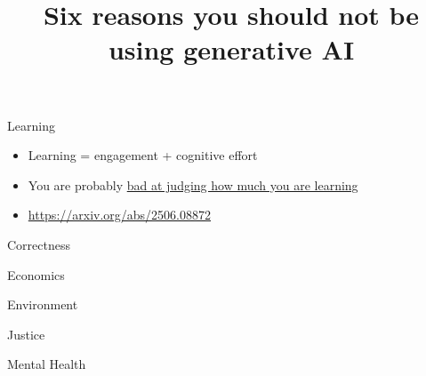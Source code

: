 \documentclass[xcolor={usenames,dvipsnames,svgnames,table},12pt]{beamer}
\title{Six reasons you should not be using generative AI}
\date{}
\begin{document}
\maketitle

\begin{frame}{Learning}
  \begin{itemize}
  \item Learning = engagement + cognitive effort
  \item You are probably \href{https://www.pnas.org/doi/10.1073/pnas.1821936116}{bad at judging how much you are learning}
  \item \url{https://arxiv.org/abs/2506.08872}
  \end{itemize}
\end{frame}

\begin{frame}{Correctness}
\end{frame}

\begin{frame}{Economics}
\end{frame}

\begin{frame}{Environment}
\end{frame}

\begin{frame}{Justice}
\end{frame}

\begin{frame}{Mental Health}
\end{frame}
\end{document}
